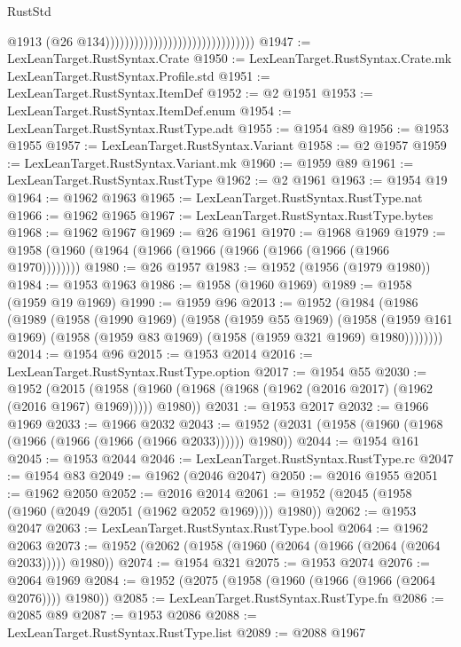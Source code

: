 \begin{lexlean}{RustStd}
\begin{coremodule}
                                                                @1913
                                                                (@26
                                                                  @134)))))))))))))))))))))))))))))))
@1947 := LexLeanTarget.RustSyntax.Crate
@1950 := LexLeanTarget.RustSyntax.Crate.mk LexLeanTarget.RustSyntax.Profile.std
@1951 := LexLeanTarget.RustSyntax.ItemDef
@1952 := @2 @1951
@1953 := LexLeanTarget.RustSyntax.ItemDef.enum
@1954 := LexLeanTarget.RustSyntax.RustType.adt
@1955 := @1954 @89
@1956 := @1953 @1955
@1957 := LexLeanTarget.RustSyntax.Variant
@1958 := @2 @1957
@1959 := LexLeanTarget.RustSyntax.Variant.mk
@1960 := @1959 @89
@1961 := LexLeanTarget.RustSyntax.RustType
@1962 := @2 @1961
@1963 := @1954 @19
@1964 := @1962 @1963
@1965 := LexLeanTarget.RustSyntax.RustType.nat
@1966 := @1962 @1965
@1967 := LexLeanTarget.RustSyntax.RustType.bytes
@1968 := @1962 @1967
@1969 := @26 @1961
@1970 := @1968 @1969
@1979 := @1958 (@1960 (@1964 (@1966 (@1966 (@1966 (@1966 (@1966 (@1966 @1970))))))))
@1980 := @26 @1957
@1983 := @1952 (@1956 (@1979 @1980))
@1984 := @1953 @1963
@1986 := @1958 (@1960 @1969)
@1989 := @1958 (@1959 @19 @1969)
@1990 := @1959 @96
@2013 := @1952
    (@1984
      (@1986
        (@1989
          (@1958
            (@1990 @1969)
            (@1958
              (@1959 @55 @1969)
              (@1958
                (@1959 @161 @1969)
                (@1958 (@1959 @83 @1969) (@1958 (@1959 @321 @1969) @1980))))))))
@2014 := @1954 @96
@2015 := @1953 @2014
@2016 := LexLeanTarget.RustSyntax.RustType.option
@2017 := @1954 @55
@2030 := @1952
    (@2015 (@1958 (@1960 (@1968 (@1968 (@1962 (@2016 @2017) (@1962 (@2016 @1967) @1969))))) @1980))
@2031 := @1953 @2017
@2032 := @1966 @1969
@2033 := @1966 @2032
@2043 := @1952 (@2031 (@1958 (@1960 (@1968 (@1966 (@1966 (@1966 (@1966 @2033)))))) @1980))
@2044 := @1954 @161
@2045 := @1953 @2044
@2046 := LexLeanTarget.RustSyntax.RustType.rc
@2047 := @1954 @83
@2049 := @1962 (@2046 @2047)
@2050 := @2016 @1955
@2051 := @1962 @2050
@2052 := @2016 @2014
@2061 := @1952 (@2045 (@1958 (@1960 (@2049 (@2051 (@1962 @2052 @1969)))) @1980))
@2062 := @1953 @2047
@2063 := LexLeanTarget.RustSyntax.RustType.bool
@2064 := @1962 @2063
@2073 := @1952 (@2062 (@1958 (@1960 (@2064 (@1966 (@2064 (@2064 @2033))))) @1980))
@2074 := @1954 @321
@2075 := @1953 @2074
@2076 := @2064 @1969
@2084 := @1952 (@2075 (@1958 (@1960 (@1966 (@1966 (@2064 @2076)))) @1980))
@2085 := LexLeanTarget.RustSyntax.RustType.fn
@2086 := @2085 @89
@2087 := @1953 @2086
@2088 := LexLeanTarget.RustSyntax.RustType.list
@2089 := @2088 @1967

\end{coremodule}
\end{lexlean}
